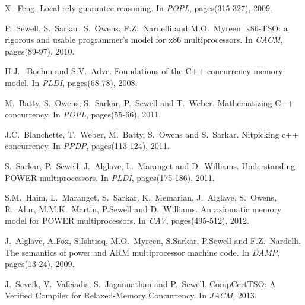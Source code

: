 \documentclass[preprint,9pt]{sigplanconf}
\begin{document}
\begin{thebibliography}{10}
X.~Feng.
\newblock Local rely-guarantee reasoning.
\newblock In {\em POPL}, pages(315-327), 2009.

P.~Sewell, S.~Sarkar, S.~Owens, F.Z.~Nardelli and M.O.~Myreen.
\newblock x86-TSO: a rigorous and usable programmer's model for x86 multiprocessors.
\newblock In {\em CACM}, pages(89-97), 2010.

H.J.~ Boehm and S.V.~Adve.
\newblock Foundations of the C++ concurrency memory model.
\newblock In {\em PLDI}, pages(68-78), 2008.

M.~Batty, S.~Owens, S.~Sarkar, P.~Sewell and T.~Weber.
\newblock Mathematizing C++ concurrency.
\newblock In {\em POPL}, pages(55-66), 2011.

J.C.~Blanchette, T.~Weber, M.~Batty, S.~Owens and S.~Sarkar.
\newblock Nitpicking c++ concurrency.
\newblock In {\em PPDP}, pages(113-124), 2011.

S.~Sarkar, P.~Sewell, J.~Alglave, L.~Maranget and D.~Williams.
\newblock Understanding POWER multiprocessors.
\newblock In {\em PLDI}, pages(175-186), 2011.

S.M.~Haim, L.~Maranget, S.~Sarkar, K.~Memarian, J.~Alglave, S.~Owens, R.~Alur, M.M.K.~Martin, P.Sewell and D.~Williams.
\newblock An axiomatic memory model for POWER multiprocessors.
\newblock In {\em CAV}, pages(495-512), 2012.

J.~Alglave, A.Fox, S.Ishtiaq, M.O.~Myreen, S.Sarkar, P.Sewell and F.Z.~Nardelli.
\newblock The semantics of power and ARM multiprocessor machine code.
\newblock In {\em DAMP}, pages(13-24), 2009.

J.~Sevcik, V.~Vafeiadis, S.~Jagannathan and P.~Sewell.
\newblock CompCertTSO: A Verified Compiler for Relaxed-Memory Concurrency.
\newblock In {\em JACM}, 2013.




\end{thebibliography}




%
\end{document}
